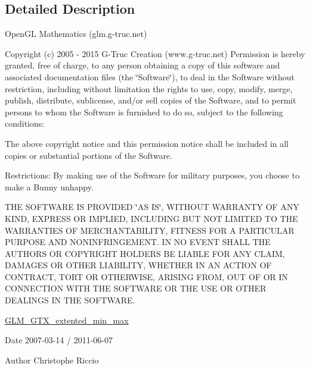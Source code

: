 \subsection{Detailed Description}
Open\-G\-L Mathematics (glm.\-g-\/truc.\-net)

Copyright (c) 2005 -\/ 2015 G-\/\-Truc Creation (www.\-g-\/truc.\-net) Permission is hereby granted, free of charge, to any person obtaining a copy of this software and associated documentation files (the \char`\"{}\-Software\char`\"{}), to deal in the Software without restriction, including without limitation the rights to use, copy, modify, merge, publish, distribute, sublicense, and/or sell copies of the Software, and to permit persons to whom the Software is furnished to do so, subject to the following conditions\-:

The above copyright notice and this permission notice shall be included in all copies or substantial portions of the Software.

Restrictions\-: By making use of the Software for military purposes, you choose to make a Bunny unhappy.

T\-H\-E S\-O\-F\-T\-W\-A\-R\-E I\-S P\-R\-O\-V\-I\-D\-E\-D \char`\"{}\-A\-S I\-S\char`\"{}, W\-I\-T\-H\-O\-U\-T W\-A\-R\-R\-A\-N\-T\-Y O\-F A\-N\-Y K\-I\-N\-D, E\-X\-P\-R\-E\-S\-S O\-R I\-M\-P\-L\-I\-E\-D, I\-N\-C\-L\-U\-D\-I\-N\-G B\-U\-T N\-O\-T L\-I\-M\-I\-T\-E\-D T\-O T\-H\-E W\-A\-R\-R\-A\-N\-T\-I\-E\-S O\-F M\-E\-R\-C\-H\-A\-N\-T\-A\-B\-I\-L\-I\-T\-Y, F\-I\-T\-N\-E\-S\-S F\-O\-R A P\-A\-R\-T\-I\-C\-U\-L\-A\-R P\-U\-R\-P\-O\-S\-E A\-N\-D N\-O\-N\-I\-N\-F\-R\-I\-N\-G\-E\-M\-E\-N\-T. I\-N N\-O E\-V\-E\-N\-T S\-H\-A\-L\-L T\-H\-E A\-U\-T\-H\-O\-R\-S O\-R C\-O\-P\-Y\-R\-I\-G\-H\-T H\-O\-L\-D\-E\-R\-S B\-E L\-I\-A\-B\-L\-E F\-O\-R A\-N\-Y C\-L\-A\-I\-M, D\-A\-M\-A\-G\-E\-S O\-R O\-T\-H\-E\-R L\-I\-A\-B\-I\-L\-I\-T\-Y, W\-H\-E\-T\-H\-E\-R I\-N A\-N A\-C\-T\-I\-O\-N O\-F C\-O\-N\-T\-R\-A\-C\-T, T\-O\-R\-T O\-R O\-T\-H\-E\-R\-W\-I\-S\-E, A\-R\-I\-S\-I\-N\-G F\-R\-O\-M, O\-U\-T O\-F O\-R I\-N C\-O\-N\-N\-E\-C\-T\-I\-O\-N W\-I\-T\-H T\-H\-E S\-O\-F\-T\-W\-A\-R\-E O\-R T\-H\-E U\-S\-E O\-R O\-T\-H\-E\-R D\-E\-A\-L\-I\-N\-G\-S I\-N T\-H\-E S\-O\-F\-T\-W\-A\-R\-E.

\hyperlink{group__gtx__extented__min__max}{G\-L\-M\-\_\-\-G\-T\-X\-\_\-extented\-\_\-min\-\_\-max}

\begin{DoxyDate}{Date}
2007-\/03-\/14 / 2011-\/06-\/07 
\end{DoxyDate}
\begin{DoxyAuthor}{Author}
Christophe Riccio 
\end{DoxyAuthor}
